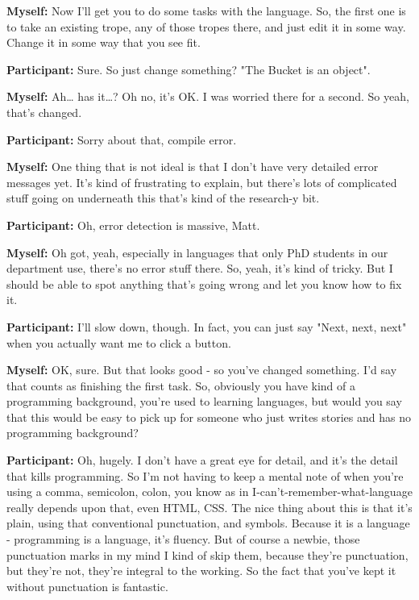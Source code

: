 \documentclass[11pt]{report}
\begin{document}
\begin{linenumbers}
\textbf{Myself:} Now I'll get you to do some tasks with the language. So, the first one is to take an existing trope, any of those tropes there, and just edit it in some way. Change it in some way that you see fit.

\textbf{Participant:} Sure. So just change something? "The Bucket is an object".

\textbf{Myself:} Ah\ldots{} has it\ldots{}? Oh no, it's OK. I was worried there for a second. So yeah, that's changed.

\textbf{Participant:} Sorry about that, compile error.

\textbf{Myself:} One thing that is not ideal is that I don't have very detailed
error messages yet. It's kind of frustrating to explain, but there's lots of
complicated stuff going on underneath this that's kind of the research-y
bit.

\textbf{Participant:} Oh, error detection is massive, Matt.

\textbf{Myself:} Oh got, yeah, especially in languages that only PhD students in our department use, there's no error stuff there. So, yeah, it's kind of tricky. But I should be able to spot anything that's going wrong and let you know how to fix it.

\textbf{Participant:} I'll slow down, though. In fact, you can just say "Next, next, next" when you actually want me to click a button.

\textbf{Myself:} OK, sure. But that looks good - so you've changed something. I'd say that counts as finishing the first task. So, obviously you have kind of a programming background, you're used to learning languages, but would you say that this would be easy to pick up for someone who just writes stories and has no programming background?

\textbf{Participant:} Oh, hugely. I don't have a great eye for detail, and it's
the detail that kills programming. So I'm not having to keep a mental note of
when you're using a comma, semicolon, colon, you know as in
I-can't-remember-what-language really depends upon that, even HTML, CSS. The
nice thing about this is that it's plain, using that conventional punctuation,
and symbols. Because it is a language - programming is a language, it's fluency.
But of course a newbie, those punctuation marks in my mind I kind of skip them,
because they're punctuation, but they're not, they're integral to the working.
So the fact that you've kept it without punctuation is fantastic.


\end{linenumbers}
\end{document}
